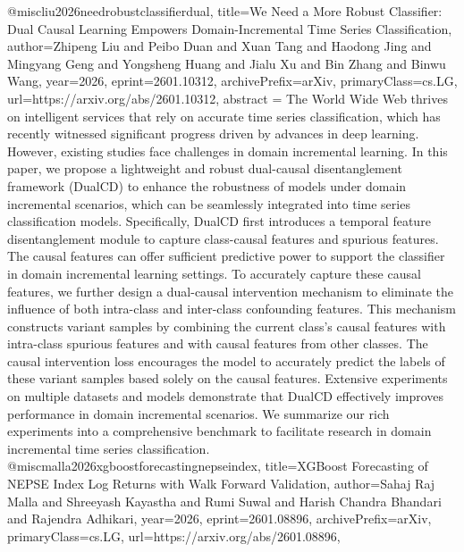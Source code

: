 {}@misc{liu2026needrobustclassifierdual,
      title={We Need a More Robust Classifier: Dual Causal Learning Empowers Domain-Incremental Time Series Classification}, 
      author={Zhipeng Liu and Peibo Duan and Xuan Tang and Haodong Jing and Mingyang Geng and Yongsheng Huang and Jialu Xu and Bin Zhang and Binwu Wang},
      year={2026},
      eprint={2601.10312},
      archivePrefix={arXiv},
      primaryClass={cs.LG},
      url={https://arxiv.org/abs/2601.10312},
      abstract = {The World Wide Web thrives on intelligent services that rely on accurate time series classification, which has recently witnessed significant progress driven by advances in deep learning. However, existing studies face challenges in domain incremental learning. In this paper, we propose a lightweight and robust dual-causal disentanglement framework (DualCD) to enhance the robustness of models under domain incremental scenarios, which can be seamlessly integrated into time series classification models. Specifically, DualCD first introduces a temporal feature disentanglement module to capture class-causal features and spurious features. The causal features can offer sufficient predictive power to support the classifier in domain incremental learning settings. To accurately capture these causal features, we further design a dual-causal intervention mechanism to eliminate the influence of both intra-class and inter-class confounding features. This mechanism constructs variant samples by combining the current class's causal features with intra-class spurious features and with causal features from other classes. The causal intervention loss encourages the model to accurately predict the labels of these variant samples based solely on the causal features. Extensive experiments on multiple datasets and models demonstrate that DualCD effectively improves performance in domain incremental scenarios. We summarize our rich experiments into a comprehensive benchmark to facilitate research in domain incremental time series classification.}
}@misc{malla2026xgboostforecastingnepseindex,
      title={XGBoost Forecasting of NEPSE Index Log Returns with Walk Forward Validation}, 
      author={Sahaj Raj Malla and Shreeyash Kayastha and Rumi Suwal and Harish Chandra Bhandari and Rajendra Adhikari},
      year={2026},
      eprint={2601.08896},
      archivePrefix={arXiv},
      primaryClass={cs.LG},
      url={https://arxiv.org/abs/2601.08896},
}
